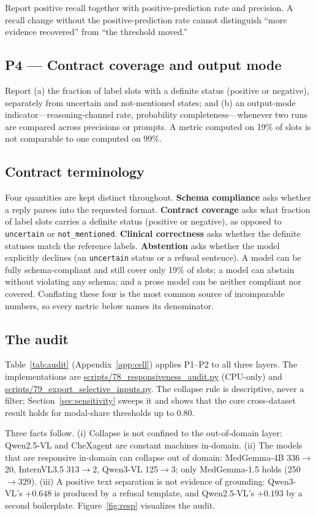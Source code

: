 Report positive recall together with positive-prediction rate and precision. A recall change without the positive-prediction rate cannot distinguish ``more evidence recovered'' from ``the threshold moved.''

\subsection{P4 --- Contract coverage and output mode}

Report (a) the fraction of label slots with a definite status (positive or negative), separately from uncertain and not-mentioned states; and (b) an output-mode indicator---reasoning-channel rate, probability completeness---whenever two runs are compared across precisions or prompts. A metric computed on 19\% of slots is not comparable to one computed on 99\%.

\subsection{Contract terminology}

Four quantities are kept distinct throughout. \textbf{Schema compliance} asks whether a reply parses into the requested format. \textbf{Contract coverage} asks what fraction of label slots carries a definite status (positive or negative), as opposed to \texttt{uncertain} or \texttt{not\_mentioned}. \textbf{Clinical correctness} asks whether the definite statuses match the reference labels. \textbf{Abstention} asks whether the model explicitly declines (an \texttt{uncertain} status or a refusal sentence). A model can be fully schema-compliant and still cover only 19\% of slots; a model can abstain without violating any schema; and a prose model can be neither compliant nor covered. Conflating these four is the most common source of incomparable numbers, so every metric below names its denominator.

\subsection{The audit}

Table~\ref{tab:audit} (Appendix~\ref{app:cell}) applies P1--P2 to all three layers. The implementations are \url{scripts/78_responsiveness_audit.py} (CPU-only) and \url{scripts/79_export_selective_inputs.py}. The collapse rule is descriptive, never a filter; Section~\ref{sec:sensitivity} sweeps it and shows that the core cross-dataset result holds for modal-share thresholds up to 0.80.

Three facts follow. (i) Collapse is not confined to the out-of-domain layer: Qwen2.5-VL and CheXagent are constant machines in-domain. (ii) The models that are responsive in-domain can collapse out of domain: MedGemma-4B 336$\rightarrow$20, InternVL3.5 313$\rightarrow$2, Qwen3-VL 125$\rightarrow$3; only MedGemma-1.5 holds (250$\rightarrow$329). (iii) A positive text separation is not evidence of grounding: Qwen3-VL's $+0.648$ is produced by a refusal template, and Qwen2.5-VL's $+0.193$ by a second boilerplate. Figure~\ref{fig:resp} visualizes the audit.
